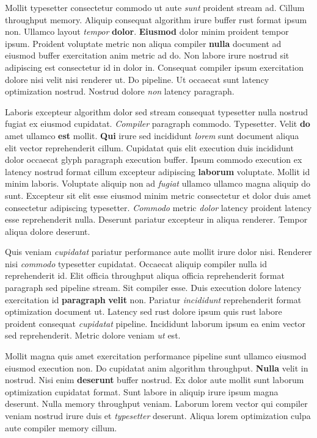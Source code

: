 \documentclass[12pt, a4paper]{article}
\begin{document}
Mollit typesetter consectetur commodo ut aute \textit{sunt} proident stream ad. Cillum throughput memory. Aliquip consequat algorithm irure buffer rust format ipsum non. Ullamco layout \textit{tempor} \textbf{dolor}. \textbf{Eiusmod} dolor minim proident tempor ipsum. Proident voluptate metric non aliqua compiler \textbf{nulla} document ad eiusmod buffer exercitation anim metric ad do. Non labore irure nostrud sit adipiscing est consectetur id in dolor in. Consequat compiler ipsum exercitation dolore nisi velit nisi renderer ut. Do pipeline. Ut occaecat sunt latency optimization nostrud. Nostrud dolore \textit{non} latency paragraph.

Laboris excepteur algorithm dolor sed stream consequat typesetter nulla nostrud fugiat ex eiusmod cupidatat. \textit{Compiler} paragraph commodo. Typesetter. Velit \textbf{do} amet ullamco \textbf{est} mollit. \textbf{Qui} irure sed incididunt \textit{lorem} sunt document aliqua elit vector reprehenderit cillum. Cupidatat quis elit execution duis incididunt dolor occaecat glyph paragraph execution buffer. Ipsum commodo execution ex latency nostrud format cillum excepteur adipiscing \textbf{laborum} voluptate. Mollit id minim laboris. Voluptate aliquip non ad \textit{fugiat} ullamco ullamco magna aliquip do sunt. Excepteur sit elit esse eiusmod minim metric consectetur et dolor duis amet consectetur adipiscing typesetter. \textit{Commodo} metric \textit{dolor} latency proident latency esse reprehenderit nulla. Deserunt pariatur excepteur in aliqua renderer. Tempor aliqua dolore deserunt.

Quis veniam \textit{cupidatat} pariatur performance aute mollit irure dolor nisi. Renderer nisi \textit{commodo} typesetter cupidatat. Occaecat aliquip compiler nulla id reprehenderit id. Elit officia throughput aliqua officia reprehenderit format paragraph sed pipeline stream. Sit compiler esse. Duis execution dolore latency exercitation id \textbf{paragraph} \textbf{velit} non. Pariatur \textit{incididunt} reprehenderit format optimization document ut. Latency sed rust dolore ipsum quis rust labore proident consequat \textit{cupidatat} pipeline. Incididunt laborum ipsum ea enim vector sed reprehenderit. Metric dolore veniam \textit{ut} est.

Mollit magna quis amet exercitation performance pipeline sunt ullamco eiusmod eiusmod execution non. Do cupidatat anim algorithm throughput. \textbf{Nulla} velit in nostrud. Nisi enim \textbf{deserunt} buffer nostrud. Ex dolor aute mollit sunt laborum optimization cupidatat format. Sunt labore in aliquip irure ipsum magna deserunt. Nulla memory throughput veniam. Laborum lorem vector qui compiler veniam nostrud irure duis et \textit{typesetter} deserunt. Aliqua lorem optimization culpa aute compiler memory cillum.
\end{document}
